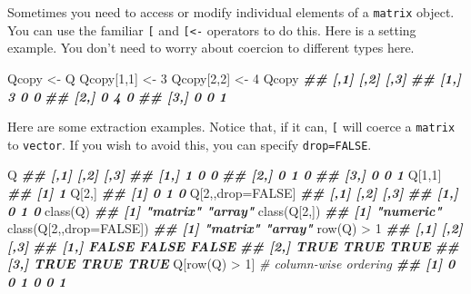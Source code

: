 \documentclass[
  12pt,
  krantz2]{krantz}
\makeatletter
\newenvironment{Shaded}{\begin{snugshade}}{\end{snugshade}}
\newcommand{\AttributeTok}[1]{\textcolor[rgb]{0.61,0.61,0.61}{#1}}
\newcommand{\CommentTok}[1]{\textcolor[rgb]{0.37,0.37,0.37}{\textit{#1}}}
\newcommand{\ConstantTok}[1]{\textcolor[rgb]{0,0,0}{#1}}
\newcommand{\DecValTok}[1]{\textcolor[rgb]{0.06,0.06,0.06}{#1}}
\newcommand{\DocumentationTok}[1]{\textcolor[rgb]{0.37,0.37,0.37}{\textbf{\textit{#1}}}}
\newcommand{\FunctionTok}[1]{\textcolor[rgb]{0,0,0}{#1}}
\newcommand{\NormalTok}[1]{#1}
\newcommand{\OtherTok}[1]{\textcolor[rgb]{0.37,0.37,0.37}{#1}}
\newcommand{\SpecialCharTok}[1]{\textcolor[rgb]{0,0,0}{#1}}
\newenvironment{kframe}{%
\medskip{}
\setlength{\fboxsep}{.8em}
 \def\at@end@of@kframe{}%
 \ifinner\ifhmode%
  \def\at@end@of@kframe{\end{minipage}}%
  \begin{minipage}{\columnwidth}%
 \fi\fi%
 \def\FrameCommand##1{\hskip\@totalleftmargin \hskip-\fboxsep
 \colorbox{shadecolor}{##1}\hskip-\fboxsep
     \hskip-\linewidth \hskip-\@totalleftmargin \hskip\columnwidth}%
 \MakeFramed {\advance\hsize-\width
   \@totalleftmargin\z@ \linewidth\hsize
   \@setminipage}}%
 {\par\unskip\endMakeFramed%
 \at@end@of@kframe}
\renewenvironment{Shaded}{\begin{kframe}}{\end{kframe}}
\makeatother
\begin{document}
Sometimes you need to access or modify individual elements of a \texttt{matrix} object. You can use the familiar \texttt{{[}} and \texttt{{[}\textless{}-} operators to do this. Here is a setting example. You don't need to worry about coercion to different types here.

\begin{Shaded}
\begin{Highlighting}[]
\NormalTok{Qcopy }\OtherTok{\textless{}{-}}\NormalTok{ Q}
\NormalTok{Qcopy[}\DecValTok{1}\NormalTok{,}\DecValTok{1}\NormalTok{] }\OtherTok{\textless{}{-}} \DecValTok{3}
\NormalTok{Qcopy[}\DecValTok{2}\NormalTok{,}\DecValTok{2}\NormalTok{] }\OtherTok{\textless{}{-}} \DecValTok{4}
\NormalTok{Qcopy}
\DocumentationTok{\#\#      [,1] [,2] [,3]}
\DocumentationTok{\#\# [1,]    3    0    0}
\DocumentationTok{\#\# [2,]    0    4    0}
\DocumentationTok{\#\# [3,]    0    0    1}
\end{Highlighting}
\end{Shaded}

Here are some extraction examples. Notice that, if it can, \texttt{{[}} will coerce a \texttt{matrix} to \texttt{vector}. If you wish to avoid this, you can specify \texttt{drop=FALSE}.

\begin{Shaded}
\begin{Highlighting}[]
\NormalTok{Q}
\DocumentationTok{\#\#      [,1] [,2] [,3]}
\DocumentationTok{\#\# [1,]    1    0    0}
\DocumentationTok{\#\# [2,]    0    1    0}
\DocumentationTok{\#\# [3,]    0    0    1}
\NormalTok{Q[}\DecValTok{1}\NormalTok{,}\DecValTok{1}\NormalTok{]}
\DocumentationTok{\#\# [1] 1}
\NormalTok{Q[}\DecValTok{2}\NormalTok{,]}
\DocumentationTok{\#\# [1] 0 1 0}
\NormalTok{Q[}\DecValTok{2}\NormalTok{,,drop}\OtherTok{=}\ConstantTok{FALSE}\NormalTok{]}
\DocumentationTok{\#\#      [,1] [,2] [,3]}
\DocumentationTok{\#\# [1,]    0    1    0}
\FunctionTok{class}\NormalTok{(Q)}
\DocumentationTok{\#\# [1] "matrix" "array"}
\FunctionTok{class}\NormalTok{(Q[}\DecValTok{2}\NormalTok{,])}
\DocumentationTok{\#\# [1] "numeric"}
\FunctionTok{class}\NormalTok{(Q[}\DecValTok{2}\NormalTok{,,}\AttributeTok{drop=}\ConstantTok{FALSE}\NormalTok{])  }
\DocumentationTok{\#\# [1] "matrix" "array"}
\FunctionTok{row}\NormalTok{(Q) }\SpecialCharTok{\textgreater{}} \DecValTok{1}
\DocumentationTok{\#\#       [,1]  [,2]  [,3]}
\DocumentationTok{\#\# [1,] FALSE FALSE FALSE}
\DocumentationTok{\#\# [2,]  TRUE  TRUE  TRUE}
\DocumentationTok{\#\# [3,]  TRUE  TRUE  TRUE}
\NormalTok{Q[}\FunctionTok{row}\NormalTok{(Q) }\SpecialCharTok{\textgreater{}} \DecValTok{1}\NormalTok{] }\CommentTok{\# column{-}wise ordering}
\DocumentationTok{\#\# [1] 0 0 1 0 0 1}
\end{Highlighting}
\end{Shaded}
\end{document}
